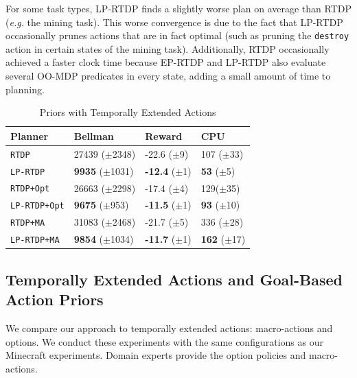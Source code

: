 \documentclass[letterpaper]{article}
\newcommand{\ra}[1]{\renewcommand{\arraystretch}{#1}} %
\begin{document}
For some task types, LP-RTDP finds a slightly worse plan on average than
RTDP ({\em e.g.} the mining task). This worse convergence is due to the fact that LP-RTDP
occasionally prunes actions that are in fact optimal (such as
pruning the \texttt{destroy} action in certain states of the mining task).
Additionally, RTDP occasionally achieved a faster clock time because EP-RTDP and LP-RTDP also evaluate several OO-MDP predicates in every state, adding a small amount of time to planning.


\begin{table}[b]
\ra{1.1}
\small
\begin{tabular}{@{}llll@{}}\toprule
Planner & Bellman & Reward & CPU \\ \midrule
\texttt{RTDP}   			&	27439 ($\pm$2348)		&	-22.6 ($\pm$9)		& 107 ($\pm$33) \\
\texttt{LP-RTDP} 			& 	{\bf 9935} ($\pm$1031)	&	{\bf -12.4} ($\pm$1)& {\bf 53} ($\pm$5) \\ \hline
\texttt{RTDP+Opt}  		&	26663 ($\pm$2298)		&	-17.4 ($\pm$4) 		& 129($\pm$35) \\
\texttt{LP-RTDP+Opt} 		& 	{\bf 9675} ($\pm$953)	&	{\bf -11.5} ($\pm$1)	&{\bf 93} ($\pm$10) \\ \hline
\texttt{RTDP+MA}  		&	31083 ($\pm$2468)		&	-21.7	 ($\pm$5)		&336 ($\pm$28) \\
\texttt{LP-RTDP+MA}  		& 	{\bf 9854} ($\pm$1034)	&	{\bf -11.7} ($\pm$1)	&{\bf 162} ($\pm$17) \\ %
\bottomrule
\end{tabular}
\caption{Priors with Temporally Extended Actions}
\label{table:temp_ext_act_results}
\end{table}


\subsection{Temporally Extended Actions and Goal-Based Action Priors}

We compare our approach to temporally extended actions: macro-actions
and options. We conduct these experiments with the same
configurations as our Minecraft experiments. Domain experts provide
the option policies and macro-actions.
\end{document}
